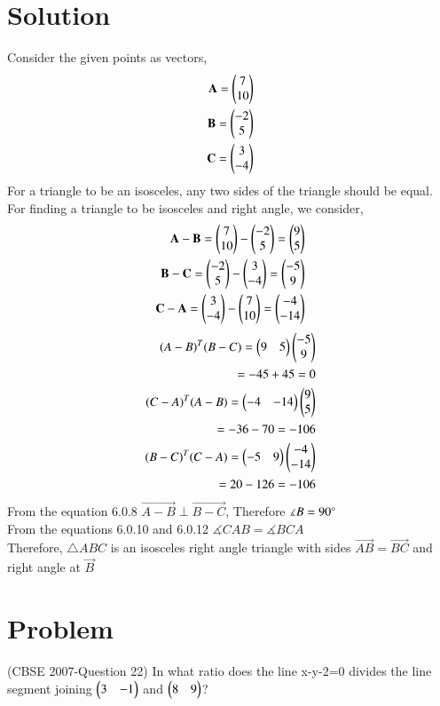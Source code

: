 \documentclass[journal,12pt,twocolumn]{IEEEtran}
\begin{document}
\section{Solution}
Consider the given points as vectors,
\begin{align}
\mathbf{A}= \begin{pmatrix}7\\10\end{pmatrix}\\
\mathbf{B}=\begin{pmatrix}-2\\5\end{pmatrix}\\
\mathbf{C}=\begin{pmatrix}3\\-4\end{pmatrix}
\end{align}
For a triangle to be an isosceles, any two sides of the triangle should be equal.
For finding a triangle to be isosceles and right angle, we consider,
\begin{align}
\mathbf{A-B}= \begin{pmatrix}7\\10\end{pmatrix} - \begin{pmatrix}-2\\5\end{pmatrix} = \begin{pmatrix}9\\5\end{pmatrix}\\
\mathbf{B-C}= \begin{pmatrix}-2\\5\end{pmatrix} - \begin{pmatrix}3\\-4\end{pmatrix} = \begin{pmatrix}-5 \\ 9\end{pmatrix}\\
\mathbf{C-A}=  \begin{pmatrix}3\\-4\end{pmatrix} - \begin{pmatrix}7\\10\end{pmatrix} = \begin{pmatrix}-4\\ -14\end{pmatrix}
\end{align}
\begin{align}
(A-B)^T(B-C) = \begin{pmatrix}9&5\end{pmatrix}\begin{pmatrix}-5\\9\end{pmatrix} \\= -45+45 = 0\\
 (C-A)^T(A-B) = \begin{pmatrix}-4&-14\end{pmatrix}\begin{pmatrix}9\\5\end{pmatrix}\\ = -36-70 = -106\\
 (B-C)^T(C-A) = \begin{pmatrix}-5&9\end{pmatrix}\begin{pmatrix}-4\\-14\end{pmatrix}\\ = 20-126 = -106
\end{align}
From the equation 6.0.8 $\vec{A-B} \perp \vec{B-C}$, Therefore $\measuredangle{B} = 90\degree$\\
From the equations 6.0.10 and 6.0.12 $\measuredangle{CAB}=\measuredangle{BCA}$\\
Therefore, $\triangle{ABC}$ is an isosceles right angle triangle with sides $\vec{AB}=\vec{BC}$ and right angle at $\vec{B}$
\section{Problem}
(CBSE 2007-Question 22) In what ratio does the line x-y-2=0 divides the line segment joining $\begin{pmatrix}3 &-1\end{pmatrix}$ and $\begin{pmatrix}8&9\end{pmatrix} $?
\end{document}
